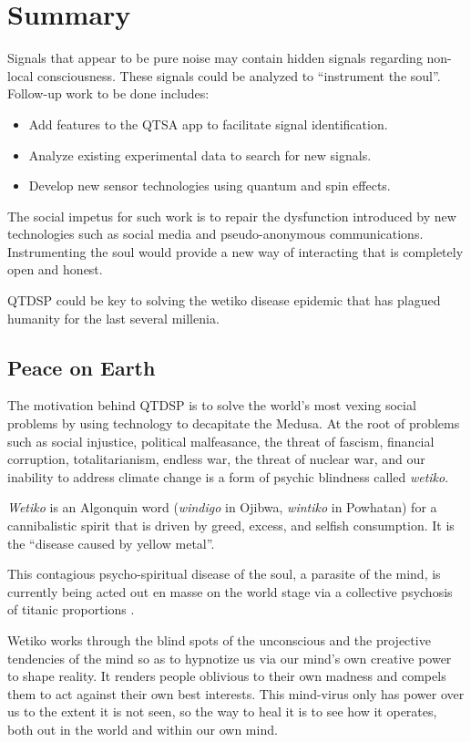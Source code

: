 \section{Summary}

Signals that appear to be pure noise may contain hidden signals regarding non-local consciousness.
These signals could be analyzed to ``instrument the soul''.
Follow-up work to be done includes:

\begin{itemize}
	\item Add features to the QTSA app to facilitate signal identification.
	\item Analyze existing experimental data to search for new signals.
	\item Develop new sensor technologies using quantum and spin effects.
\end{itemize}

The social impetus for such work is to repair the dysfunction introduced by
new technologies such as social media and pseudo-anonymous communications.
Instrumenting the soul would provide a new way of interacting that is completely open and honest.

QTDSP could be key to solving the wetiko disease epidemic that has plagued humanity for the
last several millenia. 

\subsection{Peace on Earth}

The motivation behind QTDSP is to solve the world's most vexing social problems by
using technology to decapitate the Medusa.
At the root of problems such as social injustice, political malfeasance,
the threat of fascism, financial corruption, totalitarianism,
endless war, the threat of nuclear war, and our inability to address climate change
is a form of psychic blindness called \emph{wetiko}.

\emph{Wetiko} is an Algonquin word (\emph{windigo} in Ojibwa, \emph{wintiko} in Powhatan)
for a cannibalistic spirit that is driven by greed, excess, and selfish consumption.
It is the ``disease caused by yellow metal''.

This contagious psycho-spiritual disease of the soul, a parasite of the mind, is currently
being acted out en masse on the world stage via a collective psychosis of titanic
proportions \cite{Levy}.

Wetiko works through the blind spots of the unconscious and the projective tendencies of
the mind so as to hypnotize us via our mind’s own creative power to shape reality.
It renders people oblivious to their own madness and compels them to act
against their own best interests.
This mind-virus only has power over us to the extent it is not seen, so the way to heal
it is to see how it operates, both out in the world and within our own mind.

